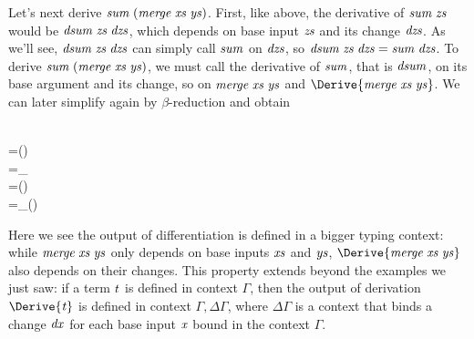Let's next derive \ensuremath{\Varid{sum}\;(\Varid{merge}\;\Varid{xs}\;\Varid{ys})}. First, like above, the
derivative of \ensuremath{\Varid{sum}\;\Varid{zs}} would be \ensuremath{\Varid{dsum}\;\Varid{zs}\;\Varid{dzs}}, which depends on
base input \ensuremath{\Varid{zs}} and its change \ensuremath{\Varid{dzs}}. As we'll see, \ensuremath{\Varid{dsum}\;\Varid{zs}\;\Varid{dzs}}
can simply call \ensuremath{\Varid{sum}} on \ensuremath{\Varid{dzs}}, so \ensuremath{\Varid{dsum}\;\Varid{zs}\;\Varid{dzs}\mathrel{=}\Varid{sum}\;\Varid{dzs}}. To
derive \ensuremath{\Varid{sum}\;(\Varid{merge}\;\Varid{xs}\;\Varid{ys})}, we must call the derivative of \ensuremath{\Varid{sum}},
that is \ensuremath{\Varid{dsum}}, on its base argument and its change, so on \ensuremath{\Varid{merge}\;\Varid{xs}\;\Varid{ys}} and \ensuremath{\Derive{\Varid{merge}\;\Varid{xs}\;\Varid{ys}}}. We can later simplify again by
$\beta$-reduction and obtain
\begin{hscode}\SaveRestoreHook
{}%
%
%
%
\>[13]{}\<[E]%
\\
\>[3]{}={}\<[13]%
\>[13]{}\;(\;\;)\;\<[E]%
\\
\>[3]{}=_{\beta}{}\<[13]%
\>[13]{}\;\<[E]%
\\
\>[3]{}={}\<[13]%
\>[13]{}\;(\;\;\;\;){}\<[E]%
\\
\>[3]{}=_{\beta}{}\<[13]%
\>[13]{}\;(\;\;){}\<[E]%
\ColumnHook
\end{hscode}\resethooks

Here we see the output of differentiation is defined in a bigger
typing context: while \ensuremath{\Varid{merge}\;\Varid{xs}\;\Varid{ys}} only depends on base inputs
\ensuremath{\Varid{xs}} and \ensuremath{\Varid{ys}}, \ensuremath{\Derive{\Varid{merge}\;\Varid{xs}\;\Varid{ys}}} also depends on their
changes. This property extends beyond the examples we just saw:
if a term \ensuremath{\Varid{t}} is defined in context \ensuremath{\Gamma}, then the output of
derivation \ensuremath{\Derive{\Varid{t}}} is defined in context \ensuremath{\Gamma,\Delta \Gamma},
where \ensuremath{\Delta \Gamma} is a context that binds a change \ensuremath{\Varid{dx}} for each
base input \ensuremath{\Varid{x}} bound in the context \ensuremath{\Gamma}.

